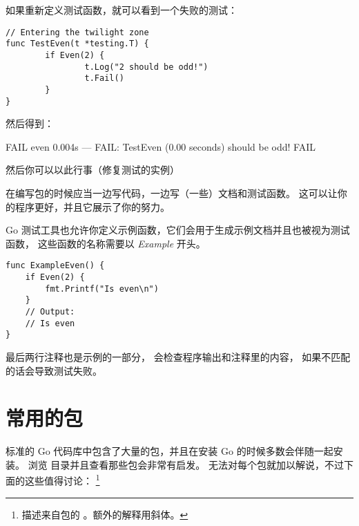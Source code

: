 如果重新定义测试函数，就可以看到一个失败的测试：
\begin{lstlisting}
// Entering the twilight zone
func TestEven(t *testing.T) {
        if Even(2) {
                t.Log("2 should be odd!")
                t.Fail()
        }   
}
\end{lstlisting}
然后得到：
\begin{display}
FAIL    even    0.004s
--- FAIL: TestEven (0.00 seconds)
\qquad{} should be odd!
FAIL
\end{display}
\noindent{}然后你可以以此行事（修复测试的实例）

\begin{lbar}{}
在编写包的时候应当一边写代码，一边写（一些）文档和测试函数。
这可以让你的程序更好，并且它展示了你的努力。
\end{lbar}

Go 测试工具也允许你定义示例函数，它们会用于生成示例文档并且也被视为测试函数，
这些函数的名称需要以 \textit{Example} 开头。
\begin{lstlisting}
func ExampleEven() {
    if Even(2) {
        fmt.Printf("Is even\n")
    }
    // Output:
    // Is even
}
\end{lstlisting}
最后两行注释也是示例的一部分， 会检查程序输出和注释里的内容，
如果不匹配的话会导致测试失败。

\section{常用的包}
标准的 Go 代码库中包含了大量的包，并且在安装 Go 的时候多数会伴随一起安装。
浏览  目录并且查看那些包会非常有启发。
无法对每个包就加以解说，不过下面的这些值得讨论：
\footnote{描述来自包的 。额外的解释用斜体。}

